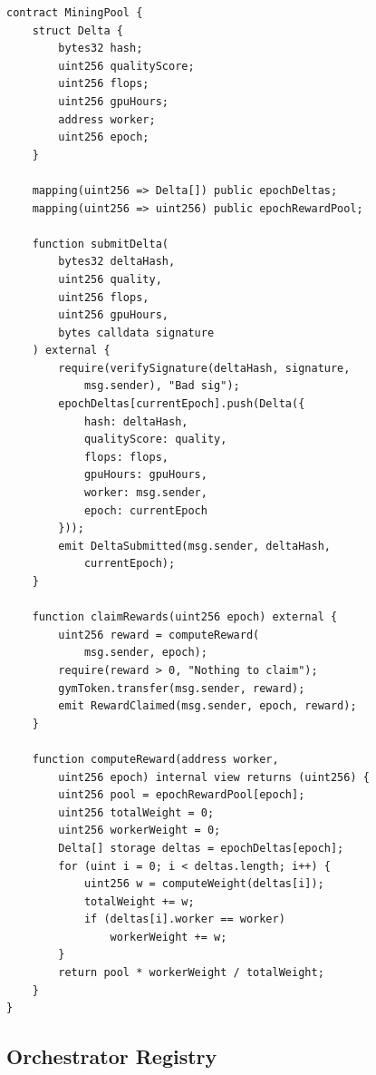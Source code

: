 \documentclass[11pt,letterpaper]{article}
\begin{document}
\begin{lstlisting}[language=Solidity,caption=Mining pool with delta submission]
contract MiningPool {
    struct Delta {
        bytes32 hash;
        uint256 qualityScore;
        uint256 flops;
        uint256 gpuHours;
        address worker;
        uint256 epoch;
    }

    mapping(uint256 => Delta[]) public epochDeltas;
    mapping(uint256 => uint256) public epochRewardPool;

    function submitDelta(
        bytes32 deltaHash,
        uint256 quality,
        uint256 flops,
        uint256 gpuHours,
        bytes calldata signature
    ) external {
        require(verifySignature(deltaHash, signature,
            msg.sender), "Bad sig");
        epochDeltas[currentEpoch].push(Delta({
            hash: deltaHash,
            qualityScore: quality,
            flops: flops,
            gpuHours: gpuHours,
            worker: msg.sender,
            epoch: currentEpoch
        }));
        emit DeltaSubmitted(msg.sender, deltaHash,
            currentEpoch);
    }

    function claimRewards(uint256 epoch) external {
        uint256 reward = computeReward(
            msg.sender, epoch);
        require(reward > 0, "Nothing to claim");
        gymToken.transfer(msg.sender, reward);
        emit RewardClaimed(msg.sender, epoch, reward);
    }

    function computeReward(address worker,
        uint256 epoch) internal view returns (uint256) {
        uint256 pool = epochRewardPool[epoch];
        uint256 totalWeight = 0;
        uint256 workerWeight = 0;
        Delta[] storage deltas = epochDeltas[epoch];
        for (uint i = 0; i < deltas.length; i++) {
            uint256 w = computeWeight(deltas[i]);
            totalWeight += w;
            if (deltas[i].worker == worker)
                workerWeight += w;
        }
        return pool * workerWeight / totalWeight;
    }
}
\end{lstlisting}

\subsection{Orchestrator Registry}
\end{document}
